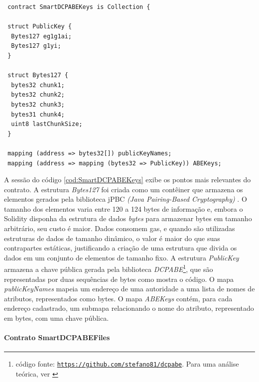 \documentclass[a4paper,11pt]{article}
\begin{document}

\begin{lstlisting}
 contract SmartDCPABEKeys is Collection {

 struct PublicKey {
  Bytes127 eg1g1ai;
  Bytes127 g1yi;
 }

 struct Bytes127 {
  bytes32 chunk1;
  bytes32 chunk2;
  bytes32 chunk3;
  bytes31 chunk4;
  uint8 lastChunkSize;
 }

 mapping (address => bytes32[]) publicKeyNames;
 mapping (address => mapping (bytes32 => PublicKey)) ABEKeys;
\end{lstlisting}


A sessão do código \ref{cod:SmartDCPABEKeys} exibe os pontos mais relevantes do contrato.
A estrutura \emph{Bytes127} foi criada como um contêiner que armazena os elementos gerados pela biblioteca jPBC \emph{(Java Pairing-Based Cryptography)} \cite{DeCaro2011}. %
O tamanho dos elementos varia entre 120 a 124 bytes de informação e, embora o Solidity disponha da estrutura de dados \emph{bytes} para armazenar bytes em tamanho arbitrário, seu custo é maior.
Dados consomem gas, e quando são utilizadas estruturas de dados de tamanho dinâmico, o valor é maior do que suas contrapartes estáticas, justificando a criação de uma estrutura que divida os dados em um conjunto de elementos de tamanho fixo.
A estrutura \emph{PublicKey} armazena a chave pública gerada pela biblioteca \emph{DCPABE}\footnote{código fonte: \href{https://github.com/stefano81/dcpabe}{\texttt{https://github.com/stefano81/dcpabe}}. Para uma análise teórica, ver \cite{Lewko2011}}, que são representadas por duas sequências de bytes como mostra o código.
O mapa \emph{publicKeyNames} mapeia um endereço de uma autoridade a uma lista de nomes de atributos, representados como bytes.
O mapa \emph{ABEKeys} contém, para cada endereço cadastrado, um submapa relacionando o nome do atributo, representado em bytes, com uma chave pública.

\paragraph{Contrato SmartDCPABEFiles}
\end{document}
